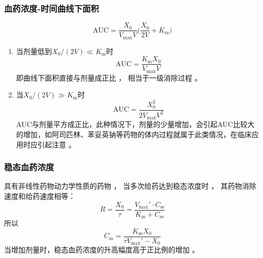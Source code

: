 \documentclass[dvipsnames, svgnames, x11names]{beamer}
\begin{document}
\begin{frame}
    \frametitle{血药浓度-时间曲线下面积}
    \[
        \mathrm{AUC}=\frac{X_{0}}{V_{\mathrm{max}}V}\biggl(\frac{X_{0}}{2V}+K_{\mathrm{m}}\biggr)
    \]
    \begin{enumerate}
      \item 当剂量低到$X_0/(2V)\ll K_{\mathrm{m}}$时
      \[
        \mathrm{AUC}=\frac{K_{\mathrm{m}}X_{0}}{V_{\mathrm{max}}V}
      \]
      即曲线下面积直接与剂量成正比 ， 相当于一级消除过程 。
      \item 当$X_0/(2V)\gg K_{\mathrm{m}}$时
      \[
        \mathrm{AUC}=\frac{X_{0}^2}{2V_{\mathrm{max}}V^2}
      \]
      AUC与剂量平方成正比，此种情况下，剂量的少量增加，会引起AUC比较大的增加，如阿司匹林、苯妥英钠等药物的体内过程就属于此类情况，在临床应用时应引起注意 。
    \end{enumerate}
\end{frame}


\begin{frame}
    \frametitle{稳态血药浓度}
    具有非线性药物动力学性质的药物 ， 当多次给药达到稳态浓度时 ， 其药物消除速度和给药速度相等：
    \[
        R = \frac{X_0}{\tau} = \frac{V_{\mathrm{max}}'\cdot C_\mathrm{ss}}{K_{\mathrm{m}}+C_\mathrm{ss}}
    \]
    所以
    \[
        C_\mathrm{ss} = \frac{K_{\mathrm{m}}X_0}{\tau V_{\mathrm{max}}' - X_0}
    \]
    当增加剂量时，稳态血药浓度的升高幅度高于正比例的增加 。
\end{frame}
\end{document}
